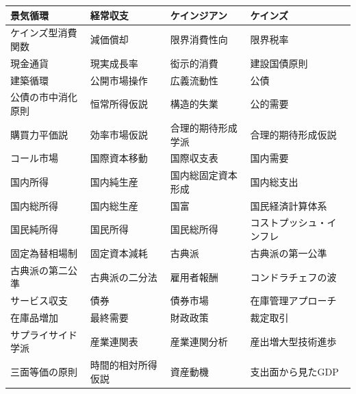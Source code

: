 \documentclass[xelatex,a4paper,base=11pt,ja=standard,jafont=noto]{bxjsreport}
\begin{document}
\begin{table}[H]
\begin{tabular}{|>{\raggedright\arraybackslash}p{3.5cm}|>{\raggedright\arraybackslash}p{3.5cm}|>{\raggedright\arraybackslash}p{3.5cm}|>{\raggedright\arraybackslash}p{3.5cm}|}
\hline
景気循環 & 経常収支 & ケインジアン & ケインズ \\
\hline
ケインズ型消費関数 & 減価償却 & 限界消費性向 & 限界税率 \\
\hline
現金通貨 & 現実成長率 & 衒示的消費 & 建設国債原則 \\
\hline
建築循環 & 公開市場操作 & 広義流動性 & 公債 \\
\hline
公債の市中消化原則 & 恒常所得仮説 & 構造的失業 & 公的需要 \\
\hline
購買力平価説 & 効率市場仮説 & 合理的期待形成学派 & 合理的期待形成仮説 \\
\hline
コール市場 & 国際資本移動 & 国際収支表 & 国内需要 \\
\hline
国内所得 & 国内純生産 & 国内総固定資本形成 & 国内総支出 \\
\hline
国内総所得 & 国内総生産 & 国富 & 国民経済計算体系 \\
\hline
国民純所得 & 国民所得 & 国民総所得 & コストプッシュ・インフレ \\
\hline
固定為替相場制 & 固定資本減耗 & 古典派 & 古典派の第一公準 \\
\hline
古典派の第二公準 & 古典派の二分法 & 雇用者報酬 & コンドラチェフの波 \\
\hline
サービス収支 & 債券 & 債券市場 & 在庫管理アプローチ \\
\hline
在庫品増加 & 最終需要 & 財政政策 & 裁定取引 \\
\hline
サプライサイド学派 & 産業連関表 & 産業連関分析 & 産出増大型技術進歩 \\
\hline
三面等価の原則 & 時間的相対所得仮説 & 資産動機 & 支出面から見たGDP \\
\hline
\end{tabular}
\end{table}
\end{document}

